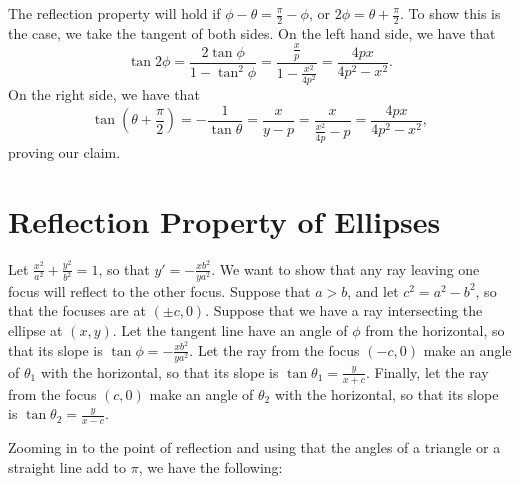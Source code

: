 \nofiles\documentclass{article}
\newcommand{\colorone}{blue}
\newcommand{\colortwo}{red}
\begin{document}
The reflection property will hold if $\phi-\theta=\frac\pi2-\phi$, or $2\phi=\theta+\frac\pi2$.  To show this is the case, we take the tangent of both sides.  On the left hand side, we have that
\[
 \tan2\phi=\frac{2\tan\phi}{1-\tan^2\phi}
 =\frac{\frac xp}{1-\frac{x^2}{4p^2}}=\frac{4px}{4p^2-x^2}.
\]
On the right side, we have that
\[
 \tan\left(\theta+\frac\pi2\right)=-\frac1{\tan\theta}=\frac x{y-p}
 =\frac x{\frac{x^2}{4p}-p}=\frac{4px}{4p^2-x^2},
\]
proving our claim.

\section{Reflection Property of Ellipses}

Let $\frac{x^2}{a^2}+\frac{y^2}{b^2}=1$, so that $y'=-\frac{xb^2}{ya^2}$.  We want to show that any ray leaving one focus will reflect to the other focus.  Suppose that $a>b$, and let $c^2=a^2-b^2$, so that the focuses are at $(\pm c,0)$.  Suppose that we have a ray intersecting the ellipse at $(x,y)$.  Let the tangent line have an angle of $\phi$ from the horizontal, so that its slope is $\tan\phi=-\frac{xb^2}{ya^2}$.  Let the ray from the focus $(-c,0)$ make an angle of $\theta_1$ with the horizontal, so that its slope is $\tan\theta_1=\frac y{x+c}$.  Finally, let the ray from the focus $(c,0)$ make an angle of $\theta_2$ with the horizontal, so that its slope is $\tan\theta_2=\frac y{x-c}$.

\begin{center}
\end{center}

Zooming in to the point of reflection and using that the angles of a triangle or a straight line add to $\pi$, we have the following:
\end{document}
